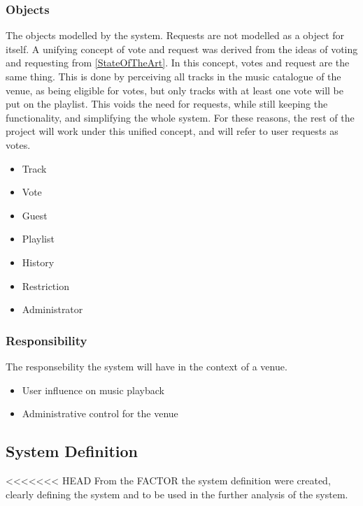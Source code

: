 \subsubsection{Objects}
The objects modelled by the system.
Requests are not modelled as a object for itself. A unifying concept of vote and request was derived from the ideas of voting and requesting from \cref{StateOfTheArt}. In this concept, votes and request are the same thing. This is done by perceiving all tracks in the music catalogue of the venue, as being eligible for votes, but only tracks with at least one vote will be put on the playlist. This voids the need for requests, while still keeping the functionality, and simplifying the whole system. For these reasons, the rest of the project will work under this unified concept, and will refer to user requests as votes.
\begin{itemize}
  \item Track
  \item Vote
  \item Guest
  \item Playlist
  \item History
  \item Restriction
  \item Administrator
\end{itemize}

\subsubsection{Responsibility}
The responsebility the system will have in the context of a venue.
\begin{itemize}
  \item User influence on music playback
  \item Administrative control for the venue
\end{itemize}

\subsection{System Definition}
<<<<<<< HEAD
From the FACTOR the system definition were created, clearly defining the system and to be used in the further analysis of the system.

